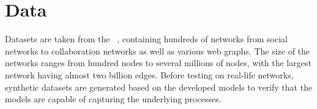 \chapter{Data}\label{ch:Data}

Datasets are taken from the ~\cite{snapnets}, containing hundreds of networks from social networks to collaboration networks as well as various web graphs. The size of the networks ranges from hundred nodes to several millions of nodes, with the largest network having almost two billion edges.
Before testing on real-life networks, synthetic datasets are generated based on the developed models to verify that the models are capable of capturing the underlying processes.%


% 

